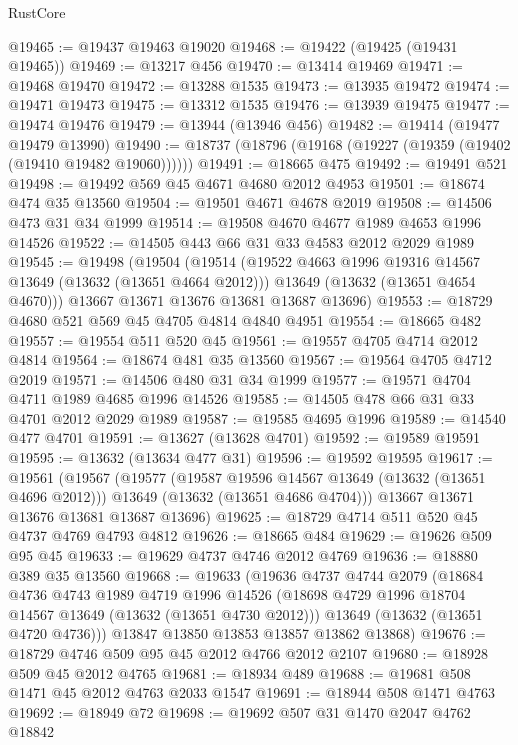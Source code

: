 \begin{lexlean}{RustCore}
\begin{coremodule}
@19465 := @19437 @19463 @19020
@19468 := @19422 (@19425 (@19431 @19465))
@19469 := @13217 @456
@19470 := @13414 @19469
@19471 := @19468 @19470
@19472 := @13288 @1535
@19473 := @13935 @19472
@19474 := @19471 @19473
@19475 := @13312 @1535
@19476 := @13939 @19475
@19477 := @19474 @19476
@19479 := @13944 (@13946 @456)
@19482 := @19414 (@19477 @19479 @13990)
@19490 := @18737 (@18796 (@19168 (@19227 (@19359 (@19402 (@19410 @19482 @19060))))))
@19491 := @18665 @475
@19492 := @19491 @521
@19498 := @19492 @569 @45 @4671 @4680 @2012 @4953
@19501 := @18674 @474 @35 @13560
@19504 := @19501 @4671 @4678 @2019
@19508 := @14506 @473 @31 @34 @1999
@19514 := @19508 @4670 @4677 @1989 @4653 @1996 @14526
@19522 := @14505 @443 @66 @31 @33 @4583 @2012 @2029 @1989
@19545 := @19498
    (@19504
      (@19514
        (@19522 @4663 @1996 @19316 @14567 @13649 (@13632 (@13651 @4664 @2012)))
        @13649
        (@13632 (@13651 @4654 @4670)))
      @13667
      @13671
      @13676
      @13681
      @13687
      @13696)
@19553 := @18729 @4680 @521 @569 @45 @4705 @4814 @4840 @4951
@19554 := @18665 @482
@19557 := @19554 @511 @520 @45
@19561 := @19557 @4705 @4714 @2012 @4814
@19564 := @18674 @481 @35 @13560
@19567 := @19564 @4705 @4712 @2019
@19571 := @14506 @480 @31 @34 @1999
@19577 := @19571 @4704 @4711 @1989 @4685 @1996 @14526
@19585 := @14505 @478 @66 @31 @33 @4701 @2012 @2029 @1989
@19587 := @19585 @4695 @1996
@19589 := @14540 @477 @4701
@19591 := @13627 (@13628 @4701)
@19592 := @19589 @19591
@19595 := @13632 (@13634 @477 @31)
@19596 := @19592 @19595
@19617 := @19561
    (@19567
      (@19577
        (@19587 @19596 @14567 @13649 (@13632 (@13651 @4696 @2012)))
        @13649
        (@13632 (@13651 @4686 @4704)))
      @13667
      @13671
      @13676
      @13681
      @13687
      @13696)
@19625 := @18729 @4714 @511 @520 @45 @4737 @4769 @4793 @4812
@19626 := @18665 @484
@19629 := @19626 @509 @95 @45
@19633 := @19629 @4737 @4746 @2012 @4769
@19636 := @18880 @389 @35 @13560
@19668 := @19633
    (@19636
      @4737
      @4744
      @2079
      (@18684
        @4736
        @4743
        @1989
        @4719
        @1996
        @14526
        (@18698 @4729 @1996 @18704 @14567 @13649 (@13632 (@13651 @4730 @2012)))
        @13649
        (@13632 (@13651 @4720 @4736)))
      @13847
      @13850
      @13853
      @13857
      @13862
      @13868)
@19676 := @18729 @4746 @509 @95 @45 @2012 @4766 @2012 @2107
@19680 := @18928 @509 @45 @2012 @4765
@19681 := @18934 @489
@19688 := @19681 @508 @1471 @45 @2012 @4763 @2033 @1547
@19691 := @18944 @508 @1471 @4763
@19692 := @18949 @72
@19698 := @19692 @507 @31 @1470 @2047 @4762 @18842

\end{coremodule}
\end{lexlean}
